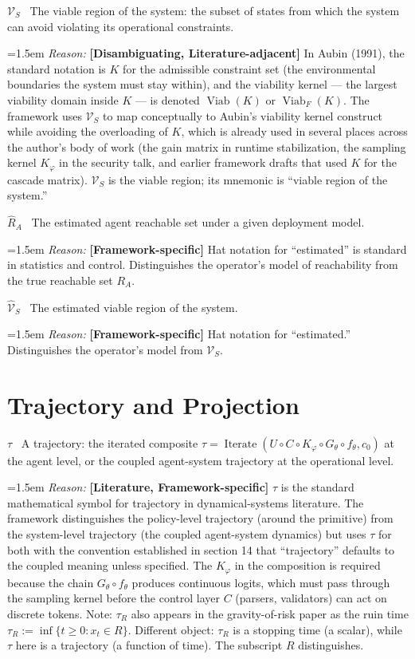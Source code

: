 \documentclass[11pt]{article}
\DeclareMathOperator{\Viab}{Viab}
\DeclareMathOperator{\Iterate}{Iterate}
\newcommand{\notation}[2]{%
  \par\smallskip
  \noindent\textbf{#1} \, #2\par
}
\newcommand{\reason}[2]{%
  \par\nopagebreak
  \begingroup
    \leftskip=1.5em
    \sloppy
    \noindent\textit{Reason:} \textbf{[#1]} #2\par
  \endgroup
  \par\smallskip
}
\begin{document}
\notation{$\mathcal{V}_S$}{The viable region of the system: the subset of states from which the system can avoid violating its operational constraints.}
\reason{Disambiguating, Literature-adjacent}{In Aubin (1991), the standard notation is $K$ for the admissible constraint set (the environmental boundaries the system must stay within), and the viability kernel --- the largest viability domain inside $K$ --- is denoted $\Viab(K)$ or $\Viab_F(K)$. The framework uses $\mathcal{V}_S$ to map conceptually to Aubin's viability kernel construct while avoiding the overloading of $K$, which is already used in several places across the author's body of work (the gain matrix in runtime stabilization, the sampling kernel $K_\varphi$ in the security talk, and earlier framework drafts that used $K$ for the cascade matrix). $\mathcal{V}_S$ is the viable region; its mnemonic is ``viable region of the system.''}

\notation{$\widehat{R}_A$}{The estimated agent reachable set under a given deployment model.}
\reason{Framework-specific}{Hat notation for ``estimated'' is standard in statistics and control. Distinguishes the operator's model of reachability from the true reachable set $R_A$.}

\notation{$\widehat{\mathcal{V}}_S$}{The estimated viable region of the system.}
\reason{Framework-specific}{Hat notation for ``estimated.'' Distinguishes the operator's model from $\mathcal{V}_S$.}

\section{Trajectory and Projection}

\notation{$\tau$}{A trajectory: the iterated composite $\tau = \Iterate(U \circ C \circ K_\varphi \circ G_\theta \circ f_\theta, c_0)$ at the agent level, or the coupled agent-system trajectory at the operational level.}
\reason{Literature, Framework-specific}{$\tau$ is the standard mathematical symbol for trajectory in dynamical-systems literature. The framework distinguishes the policy-level trajectory (around the primitive) from the system-level trajectory (the coupled agent-system dynamics) but uses $\tau$ for both with the convention established in section 14 that ``trajectory'' defaults to the coupled meaning unless specified. The $K_\varphi$ in the composition is required because the chain $G_\theta \circ f_\theta$ produces continuous logits, which must pass through the sampling kernel before the control layer $C$ (parsers, validators) can act on discrete tokens. Note: $\tau_R$ also appears in the gravity-of-risk paper as the ruin time $\tau_R := \inf\{t \ge 0 : x_t \in R\}$. Different object: $\tau_R$ is a stopping time (a scalar), while $\tau$ here is a trajectory (a function of time). The subscript $R$ distinguishes.}
\end{document}

